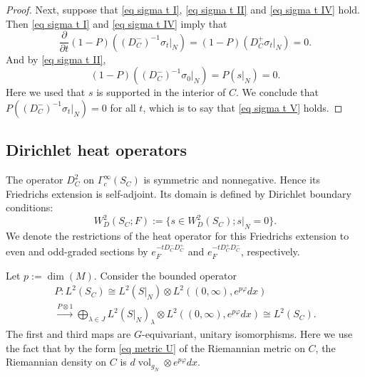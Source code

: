 \documentclass[11pt]{article}
\theoremstyle{plain}
\newtheorem{lemma}[theorem]{Lemma}
\theoremstyle{definition}
\theoremstyle{remark}
\numberwithin{equation}{section}
\DeclareMathOperator{\End}{End}
\DeclareMathOperator{\vol}{vol}
\begin{document}
\begin{proof}
Next, suppose  that \eqref{eq sigma t I}, \eqref{eq sigma t II} and \eqref{eq sigma t IV} hold. Then \eqref{eq sigma t I} and \eqref{eq sigma t IV} imply that
\[
\frac{\partial}{\partial t}(1-P)( (D_C^-)^{-1}   \sigma_t |_N)  = (1-P)( D_C^+  \sigma_t |_N) = 0.
\]
And by \eqref{eq sigma t II},
\[
(1-P)( (D_C^-)^{-1}   \sigma_0 |_N) = P(s|_N) = 0.
\]
Here we used that $s$ is supported in the interior of $C$.
We conclude that $P( (D_C^-)^{-1}   \sigma_t |_N) =0$ for all $t$, which is to say that  \eqref{eq sigma t V} holds.
\end{proof}




\subsection{Dirichlet heat operators}\label{sec heat Dirichlet}

The operator $D_C^2$ on $\Gamma^{\infty}_c(S_C)$ is symmetric and nonnegative. Hence its Friedrichs extension is self-adjoint. Its domain is defined by Dirichlet boundary conditions:
\[
W^2_D(S_C; F) := \{s \in W^2_D(S_C); s|_N = 0\}.
\]
We denote the restrictions of the heat operator for this Friedrichs extension to even and odd-graded sections by $e^{-t D_C^- D_C^+}_F$ and $e^{-t D_C^+ D_C^-}_F$, respectively.

Let $p:= \dim(M)$.  %
Consider the bounded operator
\begin{multline} \label{eq P zeta}
P \colon L^2(S_C) \cong L^2(S|_N) \otimes L^2( (0,\infty), e^{p\varphi}dx )\\
 \xrightarrow{P \otimes 1} \bigoplus_{\lambda \in J}  L^2(S|_N)_{\lambda} \otimes L^2( (0,\infty), e^{p\varphi}dx ) \cong L^2(S_C).
\end{multline}
The first and third maps are $G$-equivariant, unitary isomorphisms.
Here we use the fact that by the form \eqref{eq metric U} of the Riemannian metric on $C$, the Riemannian density on $C$ is $d\vol_{g_N} \otimes e^{p\varphi} dx$.
\end{document}
